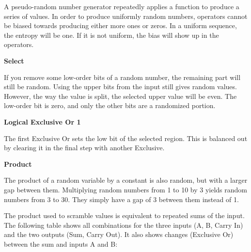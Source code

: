 \documentclass[preprint]{sigplanconf}
\begin{document}
A pseudo-random number generator repeatedly applies a function to produce a series of values. In order to produce uniformly random numbers, operators cannot be biased towards producing either more ones or zeros. In a uniform sequence, the entropy will be one. If it is not uniform, the bias will show up in the operators.

\textbf{Select}

If you remove some low-order bits of a random number, the remaining part will still be random. Using the upper bits from the input still gives random values. However, the way the value is split, the selected upper value will be even. The low-order bit is zero, and only the other bits are a randomized portion.

\textbf{Logical Exclusive Or 1}

The first Exclusive Or sets the low bit of the selected region. This is balanced out by clearing it in the final step with another Exclusive.

\textbf{Product}

The product of a random variable by a constant is also random, but with a larger gap between them. Multiplying random numbers from 1 to 10 by 3 yields random numbers from 3 to 30. They simply have a gap of 3 between them instead of 1.

The product used to scramble values is equivalent to repeated sums of the input. The following table shows all combinations for the three inputs (A, B, Carry In) and the two outputs (Sum, Carry Out). It also shows changes (Exclusive Or) between the sum and inputs A and B:
\end{document}
